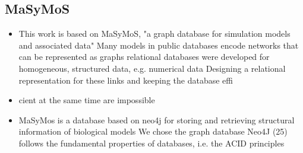 	\subsection{MaSyMoS}
	\begin{itemize}
	\item This work is based on MaSyMoS, "a graph database for simulation models and associated data" \cite{Henkel2015}
		\subitem \cite{Henkel2015} Many models in public databases encode networks that can be represented as graphs
		\subitem \cite{Henkel2015} relational databases were developed for homogeneous, structured data, e.g. numerical data
		\subitem \cite{Henkel2015} Designing a relational representation for these links and keeping the database effi\item cient at the same time are impossible
	
	\item \cite{Henkel2015} MaSyMos is a database based on neo4j for storing and retrieving structural information of biological models
		\subitem \cite{Henkel2015} We chose the graph database Neo4J (25)
		\subitem \cite{Henkel2015} follows the fundamental properties of databases, i.e. the ACID principles
		

\end{itemize}
